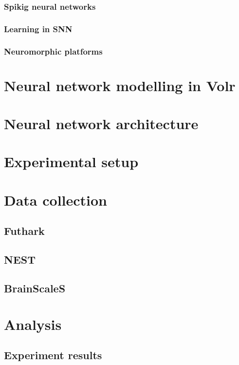 \documentclass[a4paper,oneside]{memoir}
\begin{document}
  \subsection{Spikig neural networks} \label{sec:SNN}
  \subsection{Learning in SNN}
  \subsection{Neuromorphic platforms}

\chapter{Neural network modelling in Volr} \label{sec:volr}
  

\chapter{Neural network architecture} \label{sec:model}
  

\chapter{Experimental setup} \label{sec:experiment}
  

\chapter{Data collection}
  \section{Futhark}
  \section{NEST}
  \section{BrainScaleS}

\chapter{Analysis}
  \section{Experiment results}
\end{document}
